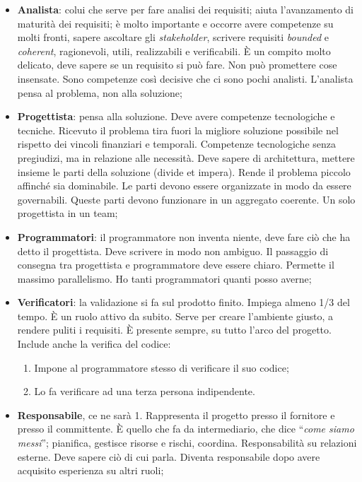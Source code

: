 \begin{itemize}

	\item \textbf{Analista}: colui che serve per fare analisi dei requisiti; aiuta l'avanzamento di maturità dei requisiti; è molto importante e occorre avere competenze su molti fronti, sapere ascoltare gli \textit{stakeholder}, scrivere requisiti \textit{bounded} e \textit{coherent}, ragionevoli, utili, realizzabili e verificabili. È un compito molto delicato, deve sapere se un requisito si può fare. Non può promettere cose insensate. Sono competenze così decisive che ci sono pochi analisti. L'analista pensa al problema, non alla soluzione;
	
	\item \textbf{Progettista}: pensa alla soluzione. Deve avere competenze tecnologiche e tecniche. Ricevuto il problema tira fuori la migliore soluzione possibile nel rispetto dei vincoli finanziari e temporali. Competenze tecnologiche senza pregiudizi, ma in relazione alle necessità. Deve sapere di architettura, mettere insieme le parti della soluzione (divide et impera). Rende il problema piccolo affinché sia dominabile. Le parti devono essere organizzate in modo da essere governabili. Queste parti devono funzionare in un aggregato coerente. Un solo progettista in un team;
	
	\item \textbf{Programmatori}: il programmatore non inventa niente, deve fare ciò che ha detto il progettista. Deve scrivere in modo non ambiguo. Il passaggio di consegna tra progettista e programmatore deve essere chiaro. Permette il massimo parallelismo. Ho tanti programmatori quanti posso averne;
	
	\item \textbf{Verificatori}: la validazione si fa sul prodotto finito. Impiega almeno 1/3 del tempo. È un ruolo attivo da subito. Serve per creare l'ambiente giusto, a rendere puliti i requisiti. È presente sempre, su tutto l'arco del progetto. Include anche la verifica del codice: 

	\begin{enumerate}
		\item Impone al programmatore stesso di verificare il suo codice;
		\item Lo fa verificare ad una terza persona indipendente.

	\end{enumerate}
	
	\item \textbf{Responsabile}, ce ne sarà 1. Rappresenta il progetto presso il fornitore e presso il committente. È quello che fa da intermediario, che dice ``\textit{come siamo messi}''; pianifica, gestisce risorse e rischi, coordina. Responsabilità su relazioni esterne. Deve sapere ciò di cui parla. Diventa responsabile dopo avere acquisito esperienza su altri ruoli;
	

\end{itemize}
